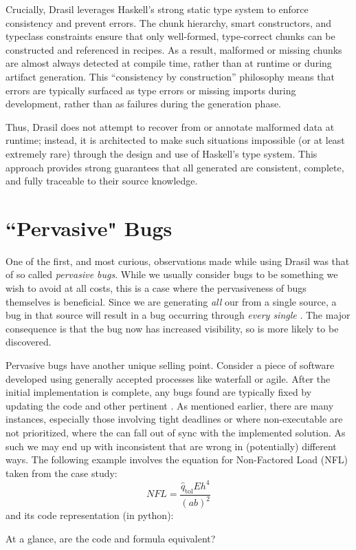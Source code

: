 Crucially, Drasil leverages Haskell's strong static type system to enforce 
consistency and prevent errors. The chunk hierarchy, smart constructors, and 
typeclass constraints ensure that only well-formed, type-correct chunks can be 
constructed and referenced in recipes. As a result, malformed or missing chunks 
are almost always detected at compile time, rather than at runtime or during 
artifact generation. This “consistency by construction” philosophy means that 
errors are typically surfaced as type errors or missing imports during 
development, rather than as failures during the generation phase.

Thus, Drasil does not attempt to recover from or annotate malformed data at 
runtime; instead, it is architected to make such situations impossible (or at 
least extremely rare) through the design and use of Haskell's type system. This 
approach provides strong guarantees that all generated \sfs{} are 
consistent, complete, and fully traceable to their source knowledge.

\section{``Pervasive" Bugs} 

One of the first, and most curious, observations made while using Drasil
was that of so called \emph{pervasive bugs}. While we usually consider bugs to 
be something we wish to avoid at all costs, this is a case where the 
pervasiveness of bugs themselves is beneficial. Since we are generating 
\emph{all} our \sfs{} from a single source, a bug in that source will 
result in a bug occurring through \emph{every single \sf{}}. The major 
consequence is that the bug now has increased visibility, so is more likely to 
be discovered.


Pervasive bugs have another unique selling point. Consider a piece of software 
developed using generally accepted processes like 
waterfall or agile. After the initial implementation is complete, any 
bugs found are typically fixed by updating the code and other pertinent 
\sfs{}. As mentioned earlier, there are many instances, especially those 
involving tight deadlines or where non-executable \sfs{} are not 
prioritized, where the \sfs{} can fall out of sync with the implemented 
solution. As such we may end up with inconsistent \sfs{} that are wrong in 
(potentially) different ways. The following example involves the equation for 
Non-Factored Load (NFL) taken from the \gb{} case study:
\[\mathit{NFL}=\frac{{\hat{q}_{\text{tol}}} E h^{4}}{\left(a b\right)^{2}}\]
and its code representation (in python): 

At a glance, are the code and formula equivalent? 

